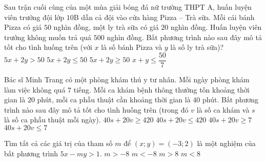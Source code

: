 \begin{ex}%
    Sau trận cuối cùng của một mùa giải bóng đá nữ trường THPT A, huấn luyện viên trưởng đội lớp $10$B dẫn cả đội vào cửa hàng Pizza – Trà sữa. Mỗi cái bánh Pizza có giá $50$ nghìn đồng, một ly trà sữa có giá $20$ nghìn đồng. Huấn luyện viên trưởng không muốn trả quá $500$ nghìn đồng. Bất phương trình nào sau đây mô tả tốt cho tình huống trên (với $x$ là số bánh Pizza và $y$ là số ly trà sữa)?
    \choice
    {$5x+2y>50$}
    {\True $5x+2y \leq 50$}
    {$5x+2y \geq 50$}
    {$x+y \leq \dfrac{50}{7}$}
\end{ex}
\begin{ex}%
    Bác sĩ Minh Trang có một phòng khám thú y tư nhân. Mỗi ngày phòng khám làm việc không quá $7$ tiếng. Mỗi ca khám bệnh thông thường tốn khoảng thời gian là $20$ phút, mỗi ca phẫu thuật cần khoảng thời gian là $40$ phút. Bất phương trình nào sau đây mô tả tốt cho tình huống trên (trong đó $v$ là số ca khám và $s$ là số ca phẫu thuật mỗi ngày).
    \choice
    {$40s+20v \geq 420$}
    {\True $40s+20v \leq 420$}
    {$40s+20v \geq 7$}
    {$40s+20v \leq 7$}
\end{ex}
\begin{ex}%
    Tìm tất cả các giá trị của tham số $m$ để $(x;y)=(-3;2)$ là một nghiệm của bất phương trình $5x-my>1$.
    \choice
    {$m>-8$}
    {\True $m<-8$}
    {$m>8$}
    {$m<8$}
\end{ex}
